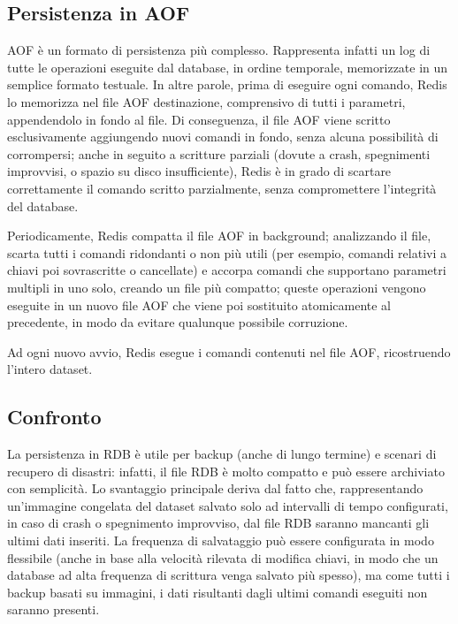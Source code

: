 \subsection{Persistenza in AOF}
\label{sec:durability:aof}

AOF è un formato di persistenza più complesso. Rappresenta infatti un log di tutte le operazioni
eseguite dal database, in ordine temporale, memorizzate in un semplice formato testuale. In altre
parole, prima di eseguire ogni comando, Redis lo memorizza nel file AOF destinazione, comprensivo di
tutti i parametri, appendendolo in fondo al file. Di conseguenza, il file AOF viene scritto
esclusivamente aggiungendo nuovi comandi in fondo, senza alcuna possibilità di corrompersi; anche in
seguito a scritture parziali (dovute a crash, spegnimenti improvvisi, o spazio su disco
insufficiente), Redis è in grado di scartare correttamente il comando scritto parzialmente, senza
compromettere l'integrità del database.

Periodicamente, Redis compatta il file AOF in background; analizzando il file, scarta tutti i
comandi ridondanti o non più utili (per esempio, comandi relativi a chiavi poi sovrascritte o
cancellate) e accorpa comandi che supportano parametri multipli in uno solo, creando un file più
compatto; queste operazioni vengono eseguite in un nuovo file AOF che viene poi sostituito
atomicamente al precedente, in modo da evitare qualunque possibile corruzione.

Ad ogni nuovo avvio, Redis esegue i comandi contenuti nel file AOF, ricostruendo l'intero dataset.


\subsection{Confronto}

La persistenza in RDB è utile per backup (anche di lungo termine) e scenari di recupero di
disastri: infatti, il file RDB è molto compatto e può essere archiviato con semplicità. Lo
svantaggio principale deriva dal fatto che, rappresentando un'immagine congelata del dataset
salvato solo ad intervalli di tempo configurati, in caso di crash o spegnimento improvviso,
dal file RDB saranno mancanti gli ultimi dati inseriti. La frequenza di salvataggio può essere
configurata in modo flessibile (anche in base alla velocità rilevata di modifica chiavi, in modo
che un database ad alta frequenza di scrittura venga salvato più spesso), ma come tutti i backup
basati su immagini, i dati risultanti dagli ultimi comandi eseguiti non saranno presenti.

